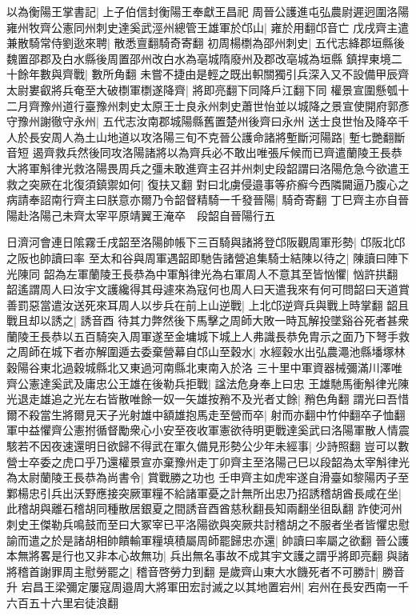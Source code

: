 以為衡陽王掌書記|{
	上子伯信封衡陽王奉獻王昌祀}
周晉公護進屯弘農尉遲迥圍洛陽雍州牧齊公憲同州刺史達奚武涇州總管王雄軍於邙山|{
	雍於用翻邙音亡}
戊戌齊主遣兼散騎常侍劉逖來聘|{
	散悉亶翻騎奇寄翻}
初周楊檦為邵州刺史|{
	五代志絳郡垣縣後魏置邵郡及白水縣後周置邵州改白水為亳城隋廢州及郡改亳城為垣縣}
鎮捍東境二十餘年數與齊戰|{
	數所角翻}
未嘗不捷由是輕之既出軹關獨引兵深入又不設備甲辰齊太尉婁叡將兵奄至大破檦軍檦遂降齊|{
	將即亮翻下同降戶江翻下同}
權景宣圍懸瓠十二月齊豫州道行臺豫州刺史太原王士良永州刺史蕭世怡並以城降之景宣使開府郭彥守豫州謝徹守永州|{
	五代志汝南郡城陽縣舊置楚州後齊曰永州}
送士良世怡及降卒千人於長安周人為土山地道以攻洛陽三旬不克晉公護命諸將塹斷河陽路|{
	塹七艷翻斷音短}
遏齊救兵然後同攻洛陽諸將以為齊兵必不敢出唯張斥候而已齊遣蘭陵王長恭大將軍斛律光救洛陽畏周兵之彊未敢進齊主召并州刺史段韶謂曰洛陽危急今欲遣王救之突厥在北復須鎮禦如何|{
	復扶又翻}
對曰北虜侵邉事等疥癬今西隣闚逼乃腹心之病請奉詔南行齊主曰朕意亦爾乃令韶督精騎一千發晉陽|{
	騎奇寄翻}
丁巳齊主亦自晉陽赴洛陽己未齊太宰平原靖翼王淹卒　段韶自晉陽行五

日濟河會連日隂霧壬戌韶至洛陽帥帳下三百騎與諸將登邙阪觀周軍形勢|{
	邙阪北邙之阪也帥讀曰率}
至太和谷與周軍遇韶即馳告諸營追集騎士結陳以待之|{
	陳讀曰陣下光陳同}
韶為左軍蘭陵王長恭為中軍斛律光為右軍周人不意其至皆忷懼|{
	忷許拱翻}
韶遙謂周人曰汝宇文護纔得其母遽來為寇何也周人曰天遣我來有何可問韶曰天道賞善罰惡當遣汝送死來耳周人以步兵在前上山逆戰|{
	上北邙逆齊兵與戰上時掌翻}
韶且戰且却以誘之|{
	誘音酉}
待其力弊然後下馬擊之周師大敗一時瓦解投墜谿谷死者甚衆蘭陵王長恭以五百騎突入周軍遂至金墉城下城上人弗識長恭免胄示之面乃下弩手救之周師在城下者亦解圍遁去委棄營幕自邙山至穀水|{
	水經穀水出弘農澠池縣墦塚林穀陽谷東北過穀城縣北又東過河南縣北東南入於洛}
三十里中軍資器械彌滿川澤唯齊公憲達奚武及庸忠公王雄在後勒兵拒戰|{
	諡法危身奉上曰忠}
王雄馳馬衝斛律光陳光退走雄追之光左右皆散唯餘一奴一矢雄按矟不及光者丈餘|{
	矟色角翻}
謂光曰吾惜爾不殺當生將爾見天子光射雄中額雄抱馬走至營而卒|{
	射而亦翻中竹仲翻卒子恤翻}
軍中益懼齊公憲拊循督勵衆心小安至夜收軍憲欲待明更戰達奚武曰洛陽軍散人情震駭若不因夜速還明日欲歸不得武在軍久備見形勢公少年未經事|{
	少詩照翻}
豈可以數營士卒委之虎口乎乃還權景宣亦棄豫州走丁卯齊主至洛陽己巳以段韶為太宰斛律光為太尉蘭陵王長恭為尚書令|{
	賞戰勝之功也}
壬申齊主如虎牢遂自滑臺如黎陽丙子至鄴楊忠引兵出沃野應接突厥軍糧不給諸軍憂之計無所出忠乃招誘稽胡酋長咸在坐|{
	此稽胡與離石稽胡同種散居銀夏之間誘音酉酋慈秋翻長知兩翻坐徂臥翻}
詐使河州刺史王傑勒兵鳴鼓而至曰大冢宰已平洛陽欲與突厥共討稽胡之不服者坐者皆懼忠慰諭而遣之於是諸胡相帥饋輸軍糧填積屬周師罷歸忠亦還|{
	帥讀曰率屬之欲翻}
晉公護本無將畧是行也又非本心故無功|{
	兵出無名事故不成其宇文護之謂乎將即亮翻}
與諸將稽首謝罪周主慰勞罷之|{
	稽音啓勞力到翻}
是歲齊山東大水饑死者不可勝計|{
	勝音升}
宕昌王梁彌定屢寇周邉周大將軍田宏討滅之以其地置宕州|{
	宕州在長安西南一千六百五十六里宕徒浪翻}


